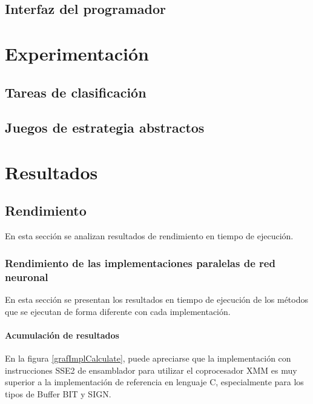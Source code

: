 \documentclass[11pt]{article}
\begin{document}
\begin{titlepage}
  \label{disenoGene}
\subsection{Interfaz del programador}
\label{sec-4-3}

  \label{disenoInterfProgr}
\newpage
\section{Experimentaci\'on}
\label{sec-5}

  \label{experimentacion}
\subsection{Tareas de clasificaci\'on}
\label{sec-5-1}

  \label{}
\subsection{Juegos de estrategia abstractos}
\label{sec-5-2}

  \label{}
\newpage
\section{Resultados}
\label{sec-6}

  \label{resultados}
\subsection{Rendimiento}
\label{sec-6-1}

  \label{rendimiento}

En esta sección se analizan resultados de rendimiento en tiempo de ejecución.
\subsubsection{Rendimiento de las implementaciones paralelas de red neuronal}
\label{sec-6-1-1}

  \label{rendImpl}

En esta sección se presentan los resultados en tiempo de ejecución de los métodos que se ejecutan de forma diferente con cada implementación.
\paragraph{Acumulación de resultados}
\label{sec-6-1-1-1}

  \label{rendImplAcumul}

En la figura \ref{grafImplCalculate}, puede apreciarse que la implementación con instrucciones SSE2 de ensamblador para utilizar el coprocesador XMM es muy superior a la implementación de referencia en lenguaje C, especialmente para los tipos de Buffer BIT y SIGN.


\end{titlepage}
\end{document}
